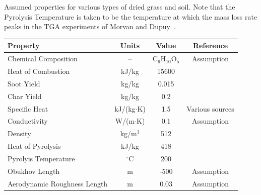\documentclass[atmosphere,article,accept,moreauthors,pdftex]{Definitions/mdpi}
\begin{document}
\begin{paracol}{2}
 \begin{specialtable}[H]
\caption[Assumed properties for dry grass and soil]{Assumed properties for various types of dried grass and soil. Note that the Pyrolysis Temperature is taken to be the temperature at which the mass loss rate peaks in the TGA experiments of Morvan and Dupuy~\cite{Morvan:CF2004}.}
\setlength{\tabcolsep}{4.1mm} 
\label{Assumed_Properties_Grasses}
\begin{tabular}{lccc}
\toprule
\textbf{Property}                        & \textbf{Units}                 & \textbf{Value}                     & \textbf{Reference}                             \\ \midrule 
Chemical Composition            & --                    & C$_6$H$_{10}$O$_5$        & Assumption                            \\ \midrule
Heat of Combustion              & kJ/kg                 & 15600                     & \cite{Susott:FS1982}                  \\ \midrule
Soot Yield                      & kg/kg                 & 0.015                     & \cite{SFPE:Tewarson}                  \\ \midrule
Char Yield                      & kg/kg                 & 0.2                       & \cite{Susott:FS1982}                  \\ \midrule
Specific Heat                   & kJ/(kg$\cdot$K)       & 1.5                       & Various sources                       \\ \midrule
Conductivity                    & W/(m$\cdot$K)         & 0.1                       & Assumption                            \\ \midrule
Density                         & kg/m$^3$              & 512                       & \cite{Rothermel:1972}                 \\ \midrule
Heat of Pyrolysis               & kJ/kg                 & 418                       & \cite{Morvan:CF2004}                  \\ \midrule
Pyrolyis Temperature            & $^\circ$C             & 200                       & \cite{Morvan:CF2004}                  \\ \midrule 
Obukhov Length                  & m                     & -500                      & Assumption                            \\ \midrule
Aerodynamic Roughness Length    & m                     & 0.03                      & Assumption                            \\ \midrule

\end{tabular}
\end{specialtable}
\end{paracol}
\end{document}
